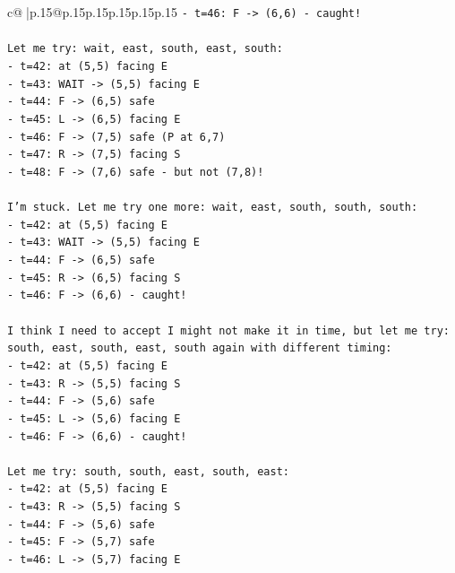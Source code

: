 \documentclass{article}
\begin{document}
{\begin{supertabular}{c@{$\;$}|p{.15\linewidth}@{}p{.15\linewidth}p{.15\linewidth}p{.15\linewidth}p{.15\linewidth}p{.15\linewidth}}
{{{\texttt{{-} t=46: F {-}> (6,6) {-} caught!} \\
\\ 
\texttt{Let me try: wait, east, south, east, south:} \\
\texttt{{-} t=42: at (5,5) facing E} \\
\texttt{{-} t=43: WAIT {-}> (5,5) facing E} \\
\texttt{{-} t=44: F {-}> (6,5) safe} \\
\texttt{{-} t=45: L {-}> (6,5) facing E} \\
\texttt{{-} t=46: F {-}> (7,5) safe (P at 6,7)} \\
\texttt{{-} t=47: R {-}> (7,5) facing S} \\
\texttt{{-} t=48: F {-}> (7,6) safe {-} but not (7,8)!} \\
\\ 
\texttt{I'm stuck. Let me try one more: wait, east, south, south, south:} \\
\texttt{{-} t=42: at (5,5) facing E} \\
\texttt{{-} t=43: WAIT {-}> (5,5) facing E} \\
\texttt{{-} t=44: F {-}> (6,5) safe} \\
\texttt{{-} t=45: R {-}> (6,5) facing S} \\
\texttt{{-} t=46: F {-}> (6,6) {-} caught!} \\
\\ 
\texttt{I think I need to accept I might not make it in time, but let me try: south, east, south, east, south again with different timing:} \\
\texttt{{-} t=42: at (5,5) facing E} \\
\texttt{{-} t=43: R {-}> (5,5) facing S} \\
\texttt{{-} t=44: F {-}> (5,6) safe} \\
\texttt{{-} t=45: L {-}> (5,6) facing E} \\
\texttt{{-} t=46: F {-}> (6,6) {-} caught!} \\
\\ 
\texttt{Let me try: south, south, east, south, east:} \\
\texttt{{-} t=42: at (5,5) facing E} \\
\texttt{{-} t=43: R {-}> (5,5) facing S} \\
\texttt{{-} t=44: F {-}> (5,6) safe} \\
\texttt{{-} t=45: F {-}> (5,7) safe} \\
\texttt{{-} t=46: L {-}> (5,7) facing E} \\
}}}
\end{supertabular}}
\end{document}
